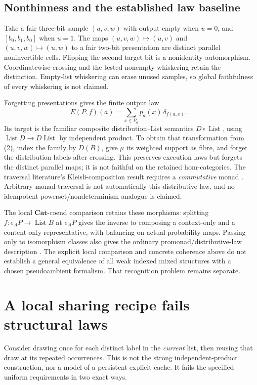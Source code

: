 \documentclass[11pt,a4paper]{article}
\newcommand{\List}{\operatorname{List}}
\newcommand{\Cat}{\mathbf{Cat}}
\begin{document}
\subsection{Nonthinness and the established law baseline}

Take a fair three-bit sample \((u,v,w)\) with output empty when \(u=0\),
and \([b_0,b_1,b_0]\) when \(u=1\). The maps
\((u,v,w)\mapsto(u,v)\) and \((u,v,w)\mapsto(u,w)\) to a fair
two-bit presentation are distinct parallel noninvertible cells. Flipping the
second target bit is a nonidentity automorphism. Coordinatewise crossing and
the tested nonempty whiskering retain the distinction. Empty-list whiskering
can erase unused samples, so global faithfulness of every whiskering is not
claimed.

Forgetting presentations gives the finite output law
\[
 E(P,f)(a)=\sum_{x\in P_a}p_a(x)\,\delta_{f(a,x)}.
\]
Its target is the familiar composite distribution--List semantics
\(D\circ\List\), using \(\List D\to D\List\) by independent
product. To obtain that transformation from (2), index the family by \(D(B)\),
give \(\mu\) its weighted support as fibre, and forget the distribution labels
after crossing. This preserves execution laws but forgets the distinct parallel maps;
it is not faithful on the retained hom-categories. The traversal literature's
Kleisli-composition result requires a \emph{commutative} monad \cite{JR}.
Arbitrary monad traversal is not automatically this distributive law, and no
idempotent powerset/nondeterminism analogue is claimed.

The local \(\Cat\)-coend comparison retains these morphisms: splitting
\(f:e_AP\to\List B\) at \(e_AP\) gives the inverse to composing a
context-only and a content-only representative, with balancing on actual
probability maps. Passing only to isomorphism classes also gives the ordinary
promonad/distributive-law description \cite{Roman}. The explicit local
comparison and concrete coherence above do not establish a general equivalence
of all weak indexed mixed structures with a chosen pseudoambient formalism.
That recognition problem remains separate.

\section{A local sharing recipe fails structural laws}

Consider drawing once for each distinct label in the \emph{current} list,
then reusing that draw at its repeated occurrences. This is not the strong
independent-product construction, nor a model of a persistent explicit cache.
It fails the specified uniform requirements in two exact ways.
\end{document}
